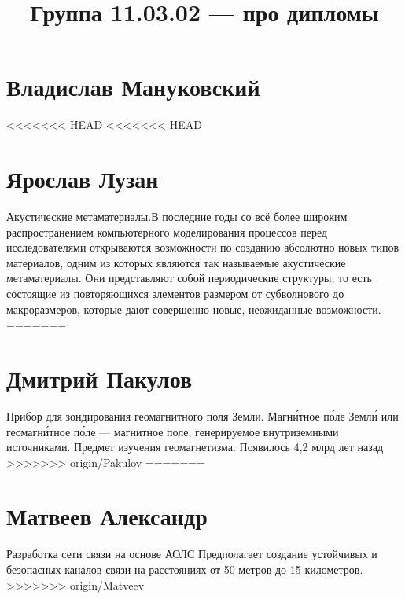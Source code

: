 \documentclass{article}
\title{Группа 11.03.02 --- про дипломы}
\begin{document}
\section*{Владислав Мануковский}
<<<<<<< HEAD
<<<<<<< HEAD
\section*{Ярослав Лузан}
Акустические метаматериалы.В последние годы со всё более широким распространением компьютерного моделирования процессов перед исследователями открываются возможности по созданию абсолютно новых типов материалов, одним из которых являются так называемые акустические метаматериалы. Они представляют собой периодические структуры, то есть состоящие из повторяющихся элементов размером от субволнового до макроразмеров, которые дают совершенно новые, неожиданные возможности.
=======
\section*{Дмитрий Пакулов}
Прибор для зондирования геомагнитного поля Земли. Магни́тное по́ле Земли́ или геомагни́тное по́ле — магнитное поле, генерируемое внутриземными источниками. Предмет изучения геомагнетизма. Появилось 4,2 млрд лет назад
>>>>>>> origin/Pakulov
=======
\section*{Матвеев Александр}
Разработка сети связи на основе АОЛС
Предполагает создание устойчивых и безопасных каналов связи на расстояниях от 50 метров до 15 километров.  
>>>>>>> origin/Matveev
\end{document}

